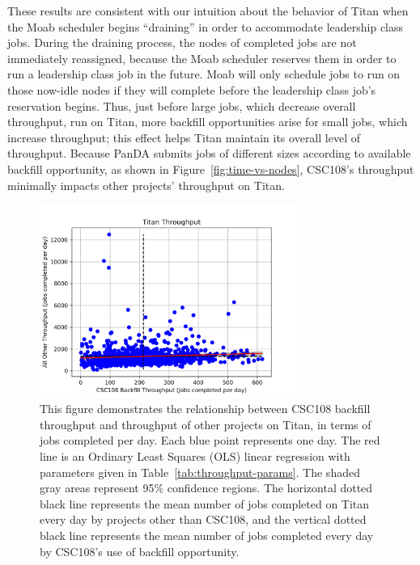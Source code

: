 These results are consistent with our intuition about the behavior of Titan
when the Moab scheduler begins ``draining'' in order to accommodate leadership
class jobs. During the draining process, the nodes of completed jobs are not
immediately reassigned, because the Moab scheduler reserves them in order to
run a leadership class job in the future. Moab will only schedule jobs to run
on those now-idle nodes if they will complete before the leadership class job's
reservation begins. Thus, just before large jobs, which decrease overall
throughput, run on Titan, more backfill opportunities arise for small jobs,
which increase throughput; this effect helps Titan maintain its overall level
of throughput. Because PanDA submits jobs of different sizes according to
available backfill opportunity, as shown in Figure~\ref{fig:time-vs-nodes},
CSC108's throughput minimally impacts other projects' throughput on Titan.

\begin{figure}
  \includegraphics[width=0.75\textwidth]{images/linfit-throughput-all.png}
\caption{This figure demonstrates the relationship between CSC108 backfill
throughput and throughput of other projects on Titan, in terms of jobs
completed per day. Each blue point represents one day. The red line is an
Ordinary Least Squares (OLS) linear regression with parameters given in
Table~\ref{tab:throughput-params}. The shaded gray areas represent 95\%
confidence regions. The horizontal dotted black line represents the mean number
of jobs completed on Titan every day by projects other than CSC108, and the
vertical dotted black line represents the mean number of jobs completed every
day by CSC108's use of backfill opportunity.}
\label{fig:throughput-all}
\end{figure}


